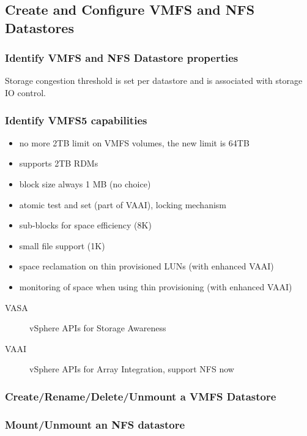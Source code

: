 \subsection{Create and Configure VMFS and NFS Datastores}

\subsubsection{Identify VMFS and NFS Datastore properties}

Storage congestion threshold is set per datastore and is associated with
storage IO control.

\subsubsection{Identify VMFS5 capabilities}

\begin{itemize}

\item no more 2TB limit on VMFS volumes, the new limit is 64TB
\item supports 2TB RDMs
\item block size always 1 MB (no choice)
\item atomic test and set (part of VAAI), locking mechanism
\item sub-blocks for space efficiency (8K)
\item small file support (1K)
\item space reclamation on thin provisioned LUNs (with enhanced VAAI)
\item monitoring of space when using thin provisioning (with enhanced VAAI)

\end{itemize}

\begin{description}

\item[VASA] vSphere APIs for Storage Awareness

\item[VAAI] vSphere APIs for Array Integration, support NFS now

\end{description}

\subsubsection{Create/Rename/Delete/Unmount a VMFS Datastore}

\subsubsection{Mount/Unmount an NFS datastore}

